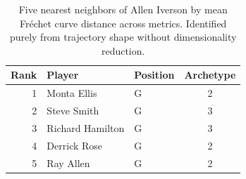 \begin{table}[htbp]
  \centering\small
  \begin{tabular}{rllc}
    \toprule
    Rank & Player & Position & Archetype \\
    \midrule
    1 & Monta Ellis & G & 2 \\
    2 & Steve Smith & G & 3 \\
    3 & Richard Hamilton & G & 3 \\
    4 & Derrick Rose & G & 2 \\
    5 & Ray Allen & G & 2 \\
    \bottomrule
  \end{tabular}
  \caption{Five nearest neighbors of Allen Iverson by mean Fr\'{e}chet curve distance across metrics. Identified purely from trajectory shape without dimensionality reduction.}
  \label{tab:Allen_Iverson_frechet_curve_neighbors}
\end{table}

